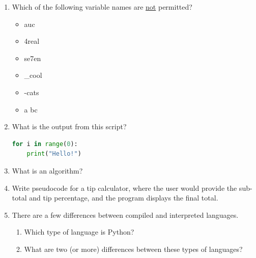 \documentclass[letter,10pt]{article}
\begin{document}
\begin{enumerate}
    \item Which of the following variable names are \underline{not} permitted?
    \begin{itemize}
        \item auc
        \item 4real
        \item se7en
        \item \_cool
        \item -cats
        \item a bc
    \end{itemize}

    \item What is the output from this script?
    \begin{lstlisting}[language=python]
for i in range(0):
    print("Hello!")
    \end{lstlisting}
    
    \item What is an algorithm?
    
    \item Write pseudocode for a tip calculator, where the user would provide the sub-total and tip percentage, and the program displays the final total.
    
    \item There are a few differences between compiled and interpreted languages.
    \begin{enumerate}
    	\item Which type of language is Python?
		\item What are two (or more) differences between these types of languages?
    \end{enumerate}
\end{enumerate}
\end{document}
